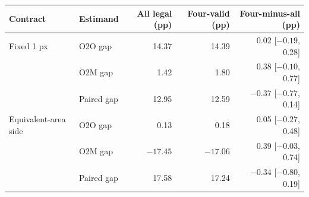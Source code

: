 \begin{tabular}{@{}llrrr@{}}
\toprule
Contract & Estimand & All legal (pp) & Four-valid (pp) & Four-minus-all (pp) \\
\midrule
Fixed 1 px & O2O gap & 14.37 & 14.39 & 0.02 [$-0.19$, 0.28] \\
 & O2M gap & 1.42 & 1.80 & 0.38 [$-0.10$, 0.77] \\
 & Paired gap & 12.95 & 12.59 & $-0.37$ [$-0.77$, 0.14] \\
\addlinespace
Equivalent-area side & O2O gap & 0.13 & 0.18 & 0.05 [$-0.27$, 0.48] \\
 & O2M gap & $-17.45$ & $-17.06$ & 0.39 [$-0.03$, 0.74] \\
 & Paired gap & 17.58 & 17.24 & $-0.34$ [$-0.80$, 0.19] \\
\bottomrule
\end{tabular}
